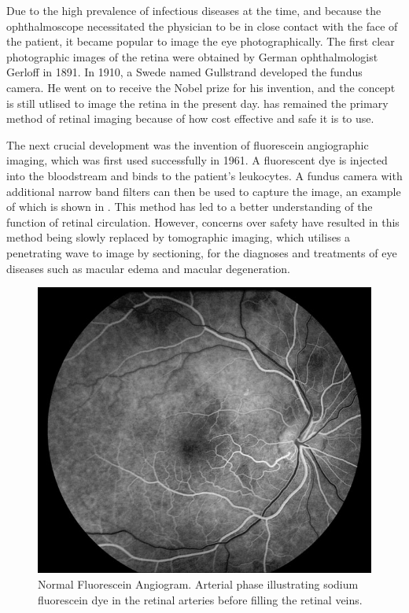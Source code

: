Due to the high prevalence of infectious diseases at the time, and because the ophthalmoscope necessitated the physician to be in close contact with the face of the patient, it became popular to image the eye photographically.  The first clear photographic images of the retina were obtained by German ophthalmologist Gerloff in 1891.\cite{gerloffphoto}  In 1910, a Swede named Gullstrand developed the fundus camera.  He went on to receive the Nobel prize for his invention, and the concept is still utlised to image the retina in the present day.\cite{gullstrandcamera}   has remained the primary method of retinal imaging because of how cost effective and safe it is to use.

The next crucial development was the invention of fluorescein angiographic imaging, which was first used successfully in 1961.  A fluorescent dye is injected into the bloodstream and binds to the patient's leukocytes.\cite{novotny1961method}  A fundus camera with additional narrow band filters can then be used to capture the image, an example of which is shown in .  This method has led to a better understanding of the function of retinal circulation.  However, concerns over safety have resulted in this method being slowly replaced by tomographic imaging, which utilises a penetrating wave to image by sectioning, for the diagnoses and treatments of eye diseases such as macular edema and macular degeneration.

\begin{figure}[htbp]
\centering
  \includegraphics{figures/fluore_angio}
\caption{Normal Fluorescein Angiogram. Arterial phase illustrating sodium fluorescein dye in the retinal arteries before filling the retinal veins.\cite{medicine_uiowa}}
\label{fig:fluore_angio_image}
\end{figure}

